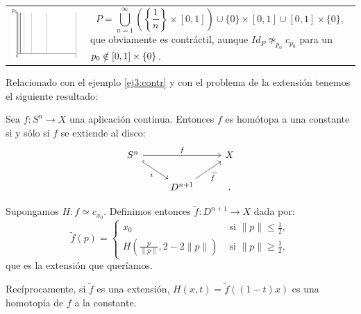 \begin{ejems}
\begin{enumerate}
\begin{tabular}{ll}
\begin{minipage}{0.3\textwidth}
\includegraphics[width=\textwidth]{images/peine.pdf}
\end{minipage}
&
\begin{minipage}{0.6\textwidth}
\[ P = \bigcup_{n=1}^\infty \left( \left\lbrace \frac{1}{n} \right\rbrace \times [0, 1]\right) \cup \{ 0 \} \times [0, 1] \cup [0, 1] \times \{ 0 \}, \]
que obviamente es contráctil, aunque $Id_P \not \simeq_{p_0} c_{p_0}$ para un $p_0 \notin [0, 1] \times \nobreak \{ 0 \} $.
\end{minipage}
\end{tabular}
\end{enumerate}

\end{ejems}
Relacionado con el ejemplo \ref{ej3:contr} y con el problema de la extensión tenemos el siguiente resultado:\\
\begin{teor}
Sea $f : S^n \longrightarrow X$ una aplicación continua. Entonces $f$ es homótopa a una constante si y sólo si $f$ se extiende al disco:
\[
\begin{tikzcd}
	S^n \arrow{rr}{f} \drar[hook, swap]{i} & & X \\
		& D^{n+1} \urar[swap]{\tilde{f}} & .
\end{tikzcd}
\]
\end{teor}
\begin{demo}
Supongamos $H : f \simeq c_{x_0}$. Definimos entonces $\tilde{f} : D^{n+1} \longrightarrow X$ dada por:
\[
\tilde{f}(p)= 
\begin{cases}
	x_0 & \text{ si }\| p \| \leq \frac{1}{2}, \\
	H(\frac{p}{\| p \|}, 2 - 2\| p \|) & \text{ si } \| p \| \geq \frac{1}{2},
\end{cases}
\]
que es la extensión que queríamos.

Recíprocamente, si $\tilde{f}$ es una extensión, $H(x, t) = \tilde{f}((1 - t)x)$ es una homotopía de $f$ a la constante. 
\end{demo}

